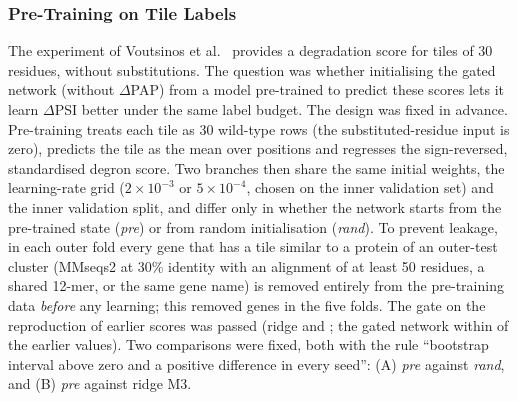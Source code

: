 \subsubsection{Pre-Training on Tile Labels}\label{sec:res-pretrain}
The experiment of Voutsinos et al.\ \citep{voutsinos2026} provides a degradation score for \nPtNTiles{} tiles of 30 residues,
without substitutions. The question was whether initialising the gated network (without $\Delta$PAP) from a model
pre-trained to predict these scores lets it learn $\Delta$PSI better under the same label budget. The design was fixed in
advance. Pre-training treats each tile as 30 wild-type rows (the substituted-residue input is zero), predicts the tile
as the mean over positions and regresses the sign-reversed, standardised degron score. Two branches then share the same
initial weights, the learning-rate grid ($2\times10^{-3}$ or $5\times10^{-4}$, chosen on the inner validation set) and the
inner validation split, and differ only in whether the network starts from the pre-trained state (\emph{pre}) or from
random initialisation (\emph{rand}). To prevent leakage, in each outer fold every gene that has a tile similar to a protein of
an outer-test cluster (MMseqs2 at 30\% identity with an alignment of at least 50 residues, a shared 12-mer, or the same gene
name) is removed entirely from the pre-training data \emph{before} any learning; this removed \nPtGenesExcl{} genes in the five folds.
The gate on the reproduction of earlier scores was passed (ridge \nAucRidge{} and \nAucRidgeExt; the gated network within \nPtGateGap{}
of the earlier values). Two comparisons were fixed, both with the rule ``bootstrap interval above zero and a positive
difference in every seed'': (A) \emph{pre} against \emph{rand}, and (B) \emph{pre} against ridge M3.

\begin{table}[htbp]
  \centering
  \caption{Macro AUROC with and without pre-training on tile labels}\label{tab:p3auroc}
  
\end{table}

\begin{table}[htbp]
  \centering
  \caption{Pre-registered comparisons for pre-training. The main configuration is the relaxed threshold 4.0; the threshold 3.0 is
  reported with the same criteria and was not used to choose the configuration.}\label{tab:p3verdict}
  
\end{table}

